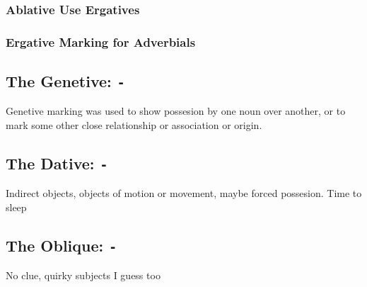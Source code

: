   \subsubsection{Ablative Use Ergatives}
  \subsubsection{Ergative Marking for Adverbials}

\subsection{The Genetive: \texttt{-\gen}}
Genetive marking was used to show possesion by one noun over another, or to mark some other close relationship or association or origin.

\subsection{The Dative: \texttt{-\dat}}
Indirect objects, objects of motion or movement, maybe forced possesion. Time to sleep

\subsection{The Oblique: \texttt{-\obl}}
No clue, quirky subjects I guess too
